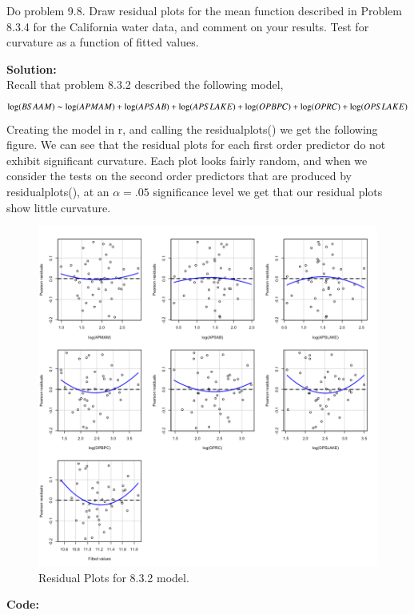\documentclass[12pt]{article}
\makeatletter
\theoremstyle{homework}
\newenvironment{exercise}[1]
{\def\@currentlabel{#1}\exercisecore}
{\endexercisecore}
\newcommand{\localhead}[1]{\par\smallskip\noindent\textbf{#1}\nobreak\\}%
\newcommand\solution{\localhead{Solution:}}
\makeatother
\begin{document}
\begin{exercise}{1} Do problem 9.8. Draw residual plots for the mean function described in Problem 8.3.4
  for the California water data, and comment on your results. Test for curvature as a function of fitted values.\\
  \solution Recall that problem 8.3.2 described the following model, 
  \begin{equation*}
    \log(BSAAM) \thicksim \log(APMAM)+\log(APSAB)+\log(APSLAKE)+\log(OPBPC)+\log(OPRC)+\log(OPSLAKE)
  \end{equation*}
  Creating the model in r, and calling the residualplots() we get the following figure. We can see that the residual plots 
  for each first order predictor do not exhibit significant curvature. Each plot looks fairly random, and when we consider the tests on the second order predictors 
  that are produced by residualplots(), at an $\alpha = .05$ significance level we get that our residual plots show little curvature. 
  \begin{figure}[H]
    \begin{center}
    \caption{Residual Plots for 8.3.2 model.}
    \includegraphics[width = .94\textwidth]{Rplot.png}
  \end{center}
\end{figure}
\textbf{Code:}
\begin{center}

\end{center} 

\end{exercise}
\newpage
\end{document}

